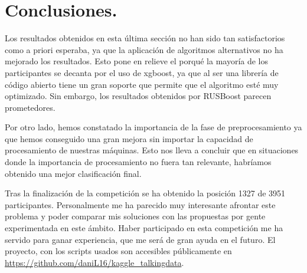 \chapter{Conclusiones.}
Los resultados obtenidos en esta última sección no han sido tan satisfactorios como a priori esperaba, ya que la aplicación de algoritmos alternativos no ha mejorado los resultados. Esto pone en relieve el porqué la mayoría de los participantes se decanta por el uso de xgboost, ya que al ser una librería de código abierto tiene un gran soporte que permite que el algoritmo esté muy optimizado. Sin embargo, los resultados obtenidos por RUSBoost parecen prometedores.

\medskip 

Por otro lado, hemos constatado la importancia de la fase de preprocesamiento ya que hemos conseguido una gran mejora sin importar la capacidad de procesamiento de nuestras máquinas. Esto nos lleva a concluir que en situaciones donde la importancia de procesamiento no fuera tan relevante, habríamos obtenido una mejor clasificación final. 

\medskip

Tras la finalización de la competición se ha obtenido la posición 1327 de 3951 participantes. Personalmente me ha parecido muy interesante afrontar este problema y poder comparar mis soluciones con las propuestas por gente experimentada en este ámbito. Haber participado en esta competición me ha servido para ganar experiencia, que me será de gran ayuda en el futuro. El proyecto, con los scripts usados son accesibles públicamente en \href{https://github.com/daniL16/kaggle\_	talkingdata}{https://github.com/daniL16/kaggle\_talkingdata}.